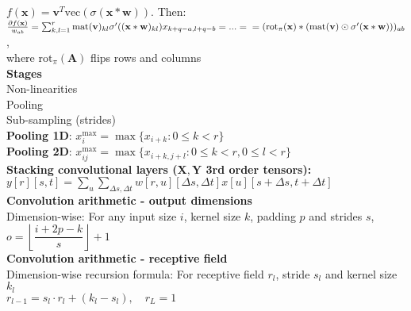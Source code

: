 $f(\mathbf x)=\mathbf v^T\text{vec}(\sigma(\mathbf x*\mathbf w))$. Then:\\
$\frac{\partial f(\mathbf x)}{w_{ab}}=\sum_{k,l=1}^r\text{mat}(\mathbf v)_{kl}\sigma'((\mathbf x*\mathbf w)_{kl})x_{k+q-a,l+q-b}=...=\\=(\text{rot}_\pi(\mathbf x)*(\text{mat}(\mathbf v)\odot\sigma'(\mathbf x*\mathbf w)))_{ab}$,\\ where $\text{rot}_\pi(\mathbf A)$ flips rows and columns\\
\textbf{Stages}\\
Non-linearities\\
Pooling\\
Sub-sampling (strides)\\
\textbf{Pooling 1D}: $x_i^{\max}=\max\{x_{i+k}: 0\leq k< r\}$\\
\textbf{Pooling 2D}: $x_{ij}^{\max}=\max\{x_{i+k,j+l}:0\leq k< r,0\leq l< r\}$\\
\textbf{Stacking convolutional layers ($\mathbf{X,Y}$ 3rd order tensors):}\\ $y[r][s,t]=\sum_u\sum_{\Delta s,\Delta t}w[r,u][\Delta s, \Delta t]x[u][s+\Delta s, t+\Delta t]$\\
\textbf{Convolution arithmetic - output dimensions}\\
Dimension-wise: For any input size $i$, kernel size $k$, padding $p$ and strides $s$,\\ $o=\left\lfloor\dfrac{i+2p-k}{s} \right\rfloor + 1$\\
\textbf{Convolution arithmetic - receptive field}\\
Dimension-wise recursion formula: For receptive field $r_l$, stride $s_l$ and kernel size $k_l$\\
$r_{l-1}=s_l\cdot r_l+(k_l-s_l), \quad r_L=1$